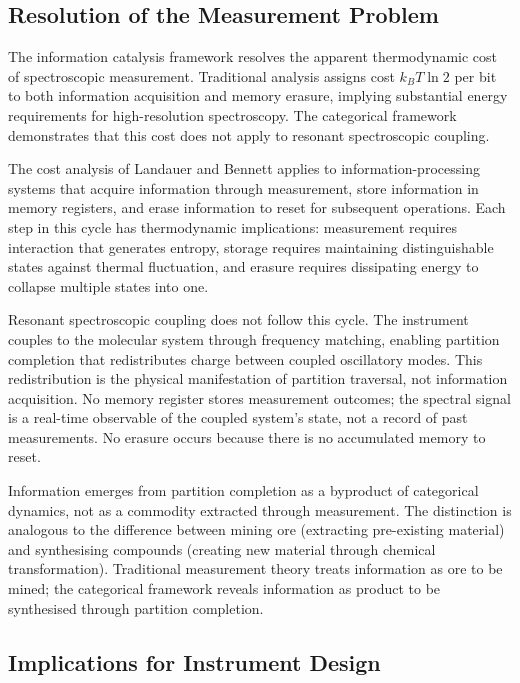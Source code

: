 \documentclass[12pt,a4paper]{article}
\theoremstyle{definition}
\theoremstyle{remark}
\begin{document}
\subsection{Resolution of the Measurement Problem}

The information catalysis framework resolves the apparent thermodynamic cost of spectroscopic measurement. Traditional analysis assigns cost $k_B T \ln 2$ per bit to both information acquisition and memory erasure, implying substantial energy requirements for high-resolution spectroscopy. The categorical framework demonstrates that this cost does not apply to resonant spectroscopic coupling.

The cost analysis of Landauer and Bennett applies to information-processing systems that acquire information through measurement, store information in memory registers, and erase information to reset for subsequent operations. Each step in this cycle has thermodynamic implications: measurement requires interaction that generates entropy, storage requires maintaining distinguishable states against thermal fluctuation, and erasure requires dissipating energy to collapse multiple states into one.

Resonant spectroscopic coupling does not follow this cycle. The instrument couples to the molecular system through frequency matching, enabling partition completion that redistributes charge between coupled oscillatory modes. This redistribution is the physical manifestation of partition traversal, not information acquisition. No memory register stores measurement outcomes; the spectral signal is a real-time observable of the coupled system's state, not a record of past measurements. No erasure occurs because there is no accumulated memory to reset.

Information emerges from partition completion as a byproduct of categorical dynamics, not as a commodity extracted through measurement. The distinction is analogous to the difference between mining ore (extracting pre-existing material) and synthesising compounds (creating new material through chemical transformation). Traditional measurement theory treats information as ore to be mined; the categorical framework reveals information as product to be synthesised through partition completion.

\subsection{Implications for Instrument Design}
\end{document}
